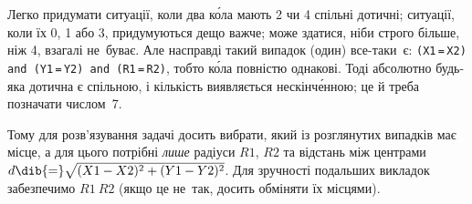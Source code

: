 \Tutorial
Легко придумати ситуації, коли два к\'{о}ла мають 2 чи 4 спільні дотичні; ситуації, коли їх 0, 1 або 3, придумуються дещо важче; може здатися, ніби строго більше, ніж 4, взагалі не~буває. Але насправді такий випадок (один) все-таки~є:
\texttt{(X1}$\,$\texttt{=}$\,$\texttt{X2) and 
(Y1}$\,$\texttt{=}$\,$\texttt{Y2) and 
(R1}$\,$\texttt{=}$\,$\texttt{R2)}, тобто к\'{о}ла повністю однакові. Тоді абсолютно будь-яка дотична є спільною, і кількість виявляється нескінч\'{е}нною; це й треба позначати числом~7.

Тому для розв'язування 
задачі досить вибрати, 
який із розглянутих випадків має місце, а для цього потрібні \emph{лише} радіуси %
$R1$, $R2$ та відстань між центрами %
$d\dib{{=}}\sqrt{(X1-X2)^2+(Y1-Y2)^2}$.
Для зручності подальших викладок забезпечимо $R1\>R2$ (якщо це не~так, досить обміняти їх місцями).

